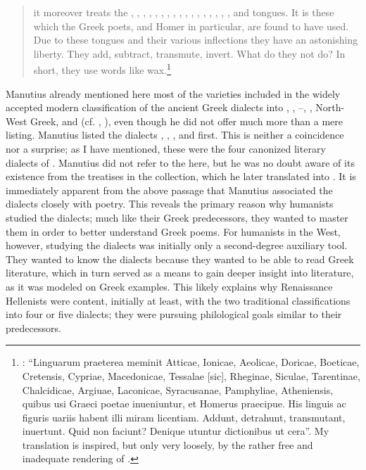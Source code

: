 \begin{quote}
it moreover treats the , , , , , , , , , , , , , , , , , and  tongues. It is these which the Greek poets, and Homer in particular, are found to have used. Due to these tongues and their various inflections they have an astonishing liberty. They add, subtract, transmute, invert. What do they not do? In short, they use words like wax.\footnote{\citet[*.ii\textsc{\textsuperscript{v}}]{Manutius1496Aldus}: “Linguarum praeterea meminit Atticae, Ionicae, Aeolicae, Doricae, Boeticae, Cretensis, Cypriae, Macedonicae, Tessalae [sic], Rheginae, Siculae, Tarentinae, Chalcidicae, Argiuae, Laconicae, Syracusanae, Pamphyliae, Atheniensis, quibus usi Graeci poetae inueniuntur, et Homerus praecipue. His linguis ac figuris uariis habent illi miram licentiam. Addunt, detrahunt, transmutant, inuertunt. Quid non faciunt? Denique utuntur dictionibus ut cera”. My translation is inspired, but only very loosely, by the rather free and inadequate rendering of \citet[12]{Bean1958}.} 
\end{quote}

Manutius already mentioned here most of the varieties included in the widely accepted modern classification of the ancient Greek dialects into , , –, , North-West Greek, and  (cf. , ), even though he did not offer much more than a mere listing. Manutius listed the dialects , , , and  first. This is neither a coincidence nor a surprise; as I have mentioned, these were the four canonized literary dialects of . Manutius did not refer to the  here, but he was no doubt aware of its existence from the treatises in the collection, which he later translated into . It is immediately apparent from the above passage that Manutius associated the dialects closely with poetry. This reveals the primary reason why humanists studied the dialects; much like their Greek predecessors, they wanted to master them in order to better understand Greek poems. For humanists in the  West, however, studying the dialects was initially only a second-degree auxiliary tool. They wanted to know the dialects because they wanted to be able to read Greek literature, which in turn served as a means to gain deeper insight into  literature, as it was modeled on Greek examples. This likely explains why Renaissance Hellenists were content, initially at least, with the two traditional classifications into four or five dialects; they were pursuing philological goals similar to their predecessors.

